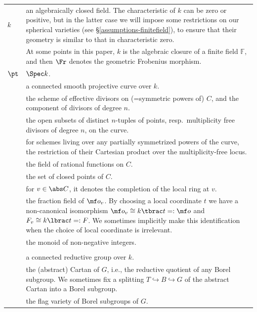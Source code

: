 \documentclass[final]{amsart}
\theoremstyle{remark}
\theoremstyle{definition}
\numberwithin{equation}{section}
\begin{document}
\begin{longtable}{>{\raggedleft}p{} p{} }
$k$ & an algebraically closed field. The characteristic of $k$ can be zero or positive, but in the latter case we will impose some restrictions on our spherical varieties (see \S \ref{assumptions-finitefield}), to ensure that their geometry is similar to that in characteristic zero. \\
{$\mathbb F$, $\Fr$} & {At some points in this paper, $k$ is the algebraic closure of a finite field $\mathbb F$, and then $\Fr$ denotes the geometric Frobenius morphism}. \\
$\pt$ & $\Spec k$. \\ 
{$C$} & {a connected smooth projective curve over $k$.} \\ 
{$\Sym C,\, C^{(n)}$} & {the scheme of effective divisors on (=symmetric powers of) $C$, and the component of divisors of degree $n$.} \\
{$\oo C^n, \oo C^{(n)}$} & {the open subsets of distinct $n$-tuples of points, resp.\ multiplicity free divisors of degree $n$, on the curve.} \\
{$\oo \prod$, $\oo\times$} & {for schemes living over any partially symmetrized powers of the curve, the restriction of their Cartesian product over the multiplicity-free locus.} \\
{$\Bbbk = k(C)$} & {the field of rational functions on $C$.}  \\
{$\abs C = C(k)$} & the set of closed points of $C$. \\
{$\mf o_v$} & {for $v\in \abs C$, it denotes the completion of the local ring at $v$.} \\
{$F_v$} & {the fraction field of $\mf o_v$.
By choosing a local coordinate $t$ we have a non-canonical isomorphism 
$\mf o_v \cong k\tbrac t =: \mf o$ and $F_v \cong k\lbrac t =: F$. We sometimes implicitly
make this identification when the choice of local coordinate is irrelevant.} \\
{$\mbb N$} & {the monoid of non-negative integers.} \\
& \\ 
{$G$} & {a connected reductive group over $k$.} \\
{$T$} & {the (abstract) Cartan of $G$, i.e., the reductive quotient of any Borel subgroup. We sometimes fix a splitting $T\hookrightarrow B\hookrightarrow G$ of the abstract Cartan into a Borel subgroup.} \\
{$\Cal B$} & {the flag variety of Borel subgroups of $G$.} \\

\end{longtable}
\end{document}
